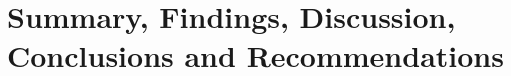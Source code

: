 \chapter{Summary, Findings, Discussion, Conclusions and Recommendations}\label{sec:summary-findings-discussion-conclusions-and-recommendations}